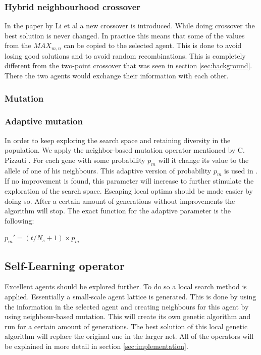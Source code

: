 \subsubsection{Hybrid neighbourhood crossover}
In the paper by Li et al \cite{Li2016} a new crossover is introduced.
While doing crossover the best solution is never changed.
In practice this means that some of the values from the $MAX_{m,n}$ can be copied to the selected agent.
This is done to avoid losing good solutions and to avoid random recombinations.
This is completely different from the two-point crossover that was seen in section \ref{sec:background}.
There the two agents would exchange their information with each other. 


\subsubsection{Mutation}
\subsubsection*{Adaptive mutation}
In order to keep exploring the search space and retaining diversity in the population. We apply the neighbor-based mutation operator mentioned by C. Pizzuti \cite{Pizzuti2012}.
For each gene with some probability $p_{m}$ will it change its value to the allele of one of his neighbours.
This adaptive version of probability $p_{m}$ is used in \cite{Li2016}.
If no improvement is found, this parameter will increase to further stimulate the exploration of the search space.
Escaping local optima should be made easier by doing so.
After a certain amount of generations without improvements the algorithm will stop.
The exact function for the adaptive parameter is the following: \\
\begin{center}
$p_{m}' = (t/N_{s} + 1) \times p_{m}$
\end{center}

\subsection*{Self-Learning operator}
Excellent agents should be explored further.
To do so a local search method is applied.
Essentially a small-scale agent lattice is generated.
This is done by using the information in the selected agent and creating neighbours for this agent by using neighbour-based mutation.
This will create its own genetic algorithm and run for a certain amount of generations.
The best solution of this local genetic algorithm will replace the original one in the larger net.
All of the operators will be explained in more detail in section \ref{sec:implementation}.

